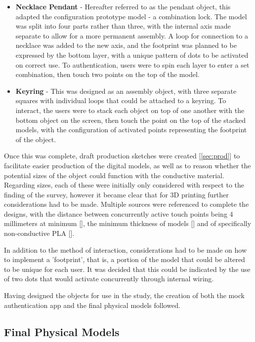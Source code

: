 \documentclass{l4proj}
\begin{document}
\begin{itemize}
    \item \textbf{Necklace Pendant} - Hereafter referred to as the pendant object, this adapted the configuration prototype model - a combination lock. The model was split into four parts rather than three, with the internal axis made separate to allow for a more permanent assembly. A loop for connection to a necklace was added to the new axis, and the footprint was planned to be expressed by the bottom layer, with a unique pattern of dots to be activated on correct use. To authentication, users were to spin each layer to enter a set combination, then touch two points on the top of the model.
    \item \textbf{Keyring} - This was designed as an assembly object, with three separate squares with individual loops that could be attached to a keyring. To interact, the users were to stack each object on top of one another with the bottom object on the screen, then touch the point on the top of the stacked models, with the configuration of activated points representing the footprint of the object.
\end{itemize}

Once this was complete, draft production sketches were created [\ref{sec:prod}] to facilitate easier production of the digital models, as well as to reason whether the potential sizes of the object could function with the conductive material. Regarding sizes, each of these were initially only considered with respect to the finding of the survey, however it became clear that for 3D printing further considerations had to be made. Multiple sources were referenced to complete the designs, with the distance between concurrently active touch points being 4 millimeters at minimum [\cite{schmitz2021itsy}], the minimum thickness of models [\cite{wallthickness}] and of specifically non-conductive PLA [\cite{schmitz2015capricate}].

In addition to the method of interaction, considerations had to be made on how to implement a 'footprint', that is, a portion of the model that could be altered to be unique for each user. It was decided that this could be indicated by the use of two dots that would activate concurrently through internal wiring.

Having designed the objects for use in the study, the creation of both the mock authentication app and the final physical models followed.

\subsection{Final Physical Models} \label{ssecmodels}
   
\end{document}
